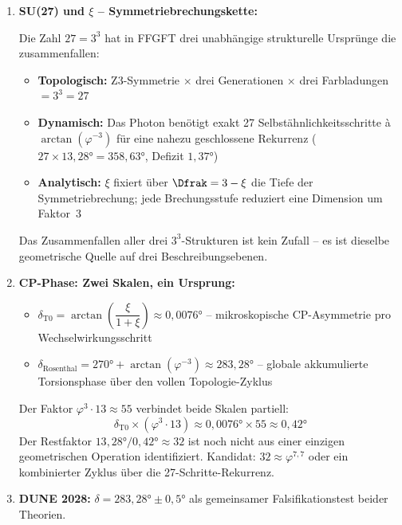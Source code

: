 \begin{enumerate}
  Die drei primitiven Windungsklassen entsprechen den drei Z3-Sektoren der Torus-Topologie -- Generationen sind keine zusätzliche Eingabe sondern topologische Konsequenz.

  \item \textbf{SU(27) und $\xi$ -- Symmetriebrechungskette:}

  Die Zahl $27 = 3^3$ hat in FFGFT drei unabhängige strukturelle Ursprünge die zusammenfallen:
  \begin{itemize}[noitemsep]
    \item \textbf{Topologisch:} Z3-Symmetrie $\times$ drei Generationen $\times$ drei Farbladungen $= 3^3 = 27$
    \item \textbf{Dynamisch:} Das Photon benötigt exakt 27 Selbstähnlichkeitsschritte à $\arctan(\varphi^{-3})$ für eine nahezu geschlossene Rekurrenz ($27 \times 13{,}28° = 358{,}63°$, Defizit $1{,}37°$)
    \item \textbf{Analytisch:} $\xi$ fixiert über $\Dfrak = 3 - \xi$ die Tiefe der Symmetriebrechung; jede Brechungsstufe reduziert eine Dimension um Faktor~3
  \end{itemize}
  Das Zusammenfallen aller drei $3^3$-Strukturen ist kein Zufall -- es ist dieselbe geometrische Quelle auf drei Beschreibungsebenen.

  \item \textbf{CP-Phase: Zwei Skalen, ein Ursprung:}
  \begin{itemize}[noitemsep]
    \item $\delta_{\text{T0}} = \arctan\!\left(\dfrac{\xi}{1+\xi}\right) \approx 0{,}0076°$ -- mikroskopische CP-Asymmetrie pro Wechselwirkungsschritt
    \item $\delta_{\text{Rosenthal}} = 270° + \arctan(\varphi^{-3}) \approx 283{,}28°$ -- globale akkumulierte Torsionsphase über den vollen Topologie-Zyklus
  \end{itemize}

  Der Faktor $\varphi^3 \cdot 13 \approx 55$ verbindet beide Skalen partiell:
  \[
    \delta_{\text{T0}} \times (\varphi^3 \cdot 13) \approx 0{,}0076° \times 55 \approx 0{,}42°
  \]
  Der Restfaktor $13{,}28° / 0{,}42° \approx 32$ ist noch nicht aus einer einzigen geometrischen Operation identifiziert. Kandidat: $32 \approx \varphi^{7{,}7}$ oder ein kombinierter Zyklus über die 27-Schritte-Rekurrenz.

  \item \textbf{DUNE 2028:} $\delta = 283{,}28° \pm 0{,}5°$ als gemeinsamer Falsifikationstest beider Theorien.

\end{enumerate}

